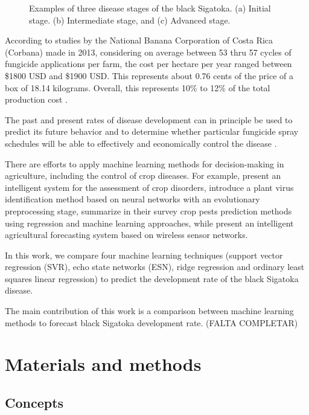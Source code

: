 \documentclass[review]{elsarticle}
\begin{document}
\begin{figure}[h]
\begin{subfigure}{.3\textwidth}
  \caption{}
  \label{fig:sfig3}
\end{subfigure}
\caption{Examples of three disease stages of the black Sigatoka. (a) Initial stage. (b) Intermediate stage, and (c) Advanced stage.} 
\label{figura1} 
\end{figure}

According to studies by the National Banana Corporation of Costa Rica
(Corbana) made in 2013, considering on average between 53 thru 57
cycles of fungicide applications per farm, the cost per hectare per
year ranged between \$1800 USD and \$1900 USD. This represents
about 0.76 cents of the price of a box of 18.14 kilograms. Overall,
this represents 10\% to 12\% of the total production cost
\citet{Bresciani2015}.

The past and present rates of disease development  can in principle be used
to predict its future behavior and to determine whether
particular fungicide spray schedules will be able to effectively and
economically control the disease \citet{ChuangJeger1987}.

There are efforts to apply machine learning methods for
decision-making in agriculture, including the control of crop
diseases. For example, \cite{Camargo2012} present an intelligent
system for the assessment of crop disorders, \cite{Huang2010}
introduce a plant virus identification method based on neural networks with an evolutionary preprocessing stage, \cite{Kim2014} summarize in
their survey crop pests prediction methods using regression and
machine learning approaches, while \cite{Zhao2013} present an
intelligent agricultural forecasting system based on wireless sensor
networks.

In this work, we compare four machine learning techniques (support vector
regression (SVR), echo state networks (ESN), ridge regression and
ordinary least squares linear regression) to predict the development rate of the black Sigatoka disease.

The main contribution of this work is a comparison between machine
learning methods to forecast black Sigatoka development rate. (FALTA COMPLETAR)


\section{Materials and methods}

\subsection{Concepts}
\end{document}
